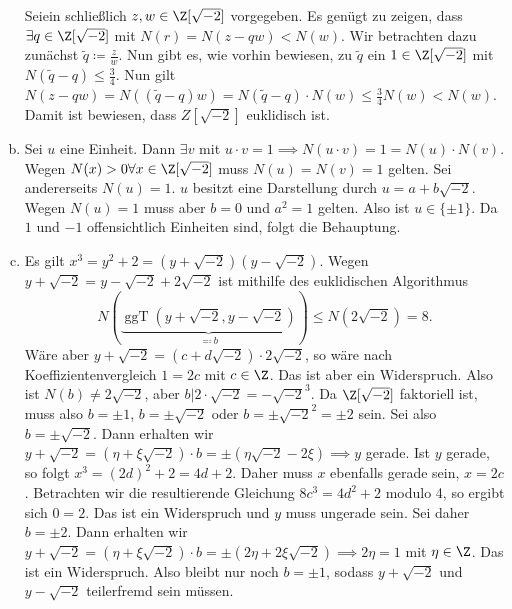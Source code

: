 \documentclass{article}
\begin{document}
\begin{enumerate}[(a)]
        Seiein schließlich $z, w\in \Z[\sqrt{-2}]$ vorgegeben. Es genügt zu zeigen, dass $\exists q\in \Z[\sqrt{-2}]$ mit $N(r) = N(z - qw) < N(w)$. Wir betrachten dazu zunächst $\tilde q \coloneqq \frac{z}{w}$. Nun gibt es, wie vorhin bewiesen, zu $\tilde q$ ein $1\in \Z[\sqrt{-2}]$ mit $N(\tilde q - q) \leq \frac{3}{4}$. Nun gilt $N(z - qw) = N((\tilde q - q)w) = N(\tilde q - q) \cdot N(w) \leq \frac{3}{4} N(w) < N(w)$. Damit ist bewiesen, dass $Z[\sqrt{-2}]$ euklidisch ist.
        \item Sei $u$ eine Einheit. Dann $\exists v$ mit $u\cdot v = 1 \implies N(u\cdot v) = 1 = N(u)\cdot N(v)$. Wegen $N(x) > 0 \forall x \in \Z[\sqrt{-2}]$ muss $N(u) = N(v) = 1$ gelten. Sei andererseits $N(u) = 1$. $u$ besitzt eine Darstellung durch $u = a + b\sqrt{-2}$. Wegen $N(u) = 1$ muss aber $b = 0$ und $a^2 = 1$ gelten. Also ist $u \in \{\pm 1\}$. Da $1$ und $-1$ offensichtlich Einheiten sind, folgt die Behauptung.
        \item Es gilt $x^3 = y^2 + 2 = (y + \sqrt{-2})(y - \sqrt{-2})$. Wegen $y + \sqrt{-2} = y - \sqrt{-2} + 2\sqrt{-2}$ ist mithilfe des euklidischen Algorithmus $$N(\underbrace{\operatorname{ggT}(y + \sqrt{-2}, y - \sqrt{-2})}_{\eqqcolon b}) \leq N(2\sqrt{-2}) = 8.$$ Wäre aber $y + \sqrt{-2} = (c + d\sqrt{-2}) \cdot 2 \sqrt{-2}$, so wäre nach Koeffizientenvergleich $1 = 2c$ mit $c\in \Z$. Das ist aber ein Widerspruch. Also ist $N(b) \neq 2\sqrt{-2}$, aber $b | 2 \cdot \sqrt{-2} = -\sqrt{-2}^3$. Da $\Z[\sqrt{-2}]$ faktoriell ist, muss also $b = \pm 1$, $b = \pm \sqrt{-2}$ oder $b = \pm \sqrt{-2}^2 = \pm 2$ sein. Sei also $b = \pm \sqrt{-2}$. Dann erhalten wir $y + \sqrt{-2} = (\eta + \xi \sqrt{-2})\cdot b = \pm (\eta\sqrt{-2} -2 \xi) \implies y$ gerade. Ist $y$ gerade, so folgt $x^3 = (2d)^2 + 2 = 4d + 2$. Daher muss $x$ ebenfalls gerade sein, $x = 2c$. Betrachten wir die resultierende Gleichung $8c^3 = 4d^2 + 2$ modulo 4, so ergibt sich $0 = 2$. Das ist ein Widerspruch und $y$ muss ungerade sein.
        Sei daher $b = \pm 2$. Dann erhalten wir $y + \sqrt{-2} = (\eta + \xi \sqrt{-2})\cdot b = \pm (2\eta + 2\xi\sqrt{-2}) \implies 2\eta = 1$ mit $\eta \in \Z$. Das ist ein Widerspruch. Also bleibt nur noch $b = \pm 1$, sodass $y + \sqrt{-2}$ und $y -\sqrt{-2}$ teilerfremd sein müssen.


\end{enumerate}
\end{document}
